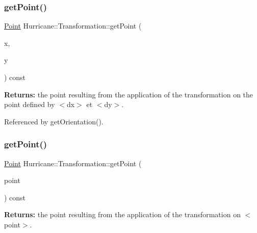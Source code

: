 \subsubsection{\texorpdfstring{get\+Point()}{getPoint()}\hspace{0.1cm}{\footnotesize\ttfamily [1/2]}}
{\footnotesize\ttfamily \hyperlink{classHurricane_1_1Point}{Point} Hurricane\+::\+Transformation\+::get\+Point (\begin{DoxyParamCaption}\item[{const \hyperlink{group__DbUGroup_ga4fbfa3e8c89347af76c9628ea06c4146}{Db\+U\+::\+Unit} \&}]{x,  }\item[{const \hyperlink{group__DbUGroup_ga4fbfa3e8c89347af76c9628ea06c4146}{Db\+U\+::\+Unit} \&}]{y }\end{DoxyParamCaption}) const}

{\bfseries Returns\+:} the point resulting from the application of the transformation on the point defined by {\ttfamily $<$dx$>$} et {\ttfamily $<$dy$>$}. 

Referenced by get\+Orientation().

\mbox{\label{classHurricane_1_1Transformation_a002347125ae10c408aa5e74d3c36d62f}} 
\subsubsection{\texorpdfstring{get\+Point()}{getPoint()}\hspace{0.1cm}{\footnotesize\ttfamily [2/2]}}
{\footnotesize\ttfamily \hyperlink{classHurricane_1_1Point}{Point} Hurricane\+::\+Transformation\+::get\+Point (\begin{DoxyParamCaption}\item[{const \hyperlink{classHurricane_1_1Point}{Point} \&}]{point }\end{DoxyParamCaption}) const}

{\bfseries Returns\+:} the point resulting from the application of the transformation on {\ttfamily $<$point$>$}. \mbox{\label{classHurricane_1_1Transformation_a1335b209ff017d8bfd6f81ae65ae6cd7}} 
